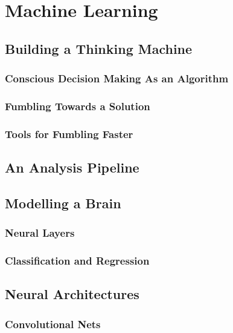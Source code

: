 \chapter{Machine Learning}

\section{Building a Thinking Machine}

\subsection{Conscious Decision Making As an Algorithm}

\subsection{Fumbling Towards a Solution}

\subsection{Tools for Fumbling Faster}

\section{An Analysis Pipeline}

\section{Modelling a Brain}

\subsection{Neural Layers}

\subsection{Classification and Regression}

\section{Neural Architectures}

\subsection{Convolutional Nets}

